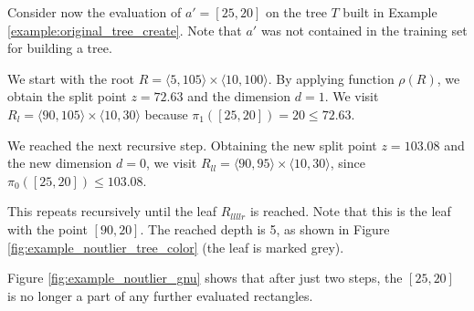 \begin{example}
\label{ex:novelty_point_evaluation_original}
    Consider now the evaluation of $a' = [25,20]$ on the tree $T$ built in Example \ref{example:original_tree_create}. Note that $a'$ was not contained in the training set for building a tree.

    We start with the root $R = \langle 5,105\rangle \times \langle 10, 100 \rangle$.
    By applying function $\rho(R)$, we obtain the split point $z = 72.63$ and the dimension $d = 1$.
We visit $R_l = \langle 90,105\rangle \times \langle 10, 30 \rangle$ 
because $\pi_1([25,20]) = 20 \le 72.63.$

We reached the next recursive step. Obtaining the new split point $z = 103.08$ and the new dimension $d = 0$, we visit $R_{ll} = \langle 90,95\rangle \times \langle 10, 30 \rangle$, since $\pi_0([25,20]) \le 103.08$.


This repeats recursively until the leaf $R_{llllr}$ is reached. Note that this is the leaf with the point $[90,20]$. The reached depth is 5, as shown in Figure \ref{fig:example_noutlier_tree_color} (the leaf is marked grey).


Figure \ref{fig:example_noutlier_gnu} shows that after just two steps, the $[25,20]$ is no longer a part of any further evaluated rectangles.

\end{example}

